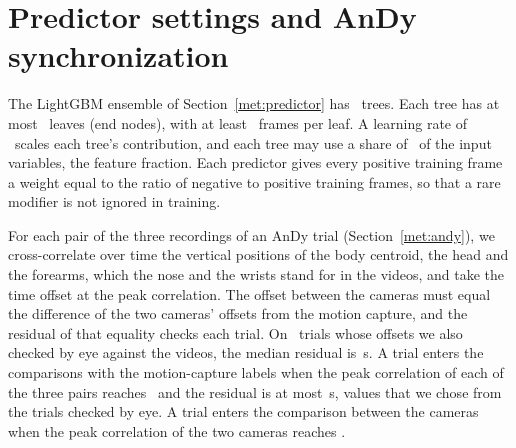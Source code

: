 \documentclass[review,3p,authoryear]{elsarticle}
\begin{document}
\clearpage
\section{Predictor settings and AnDy synchronization}
\label{app:settings}

The LightGBM ensemble of Section~\ref{met:predictor} has \lgbmTrees\ trees. Each tree has
at most \lgbmLeaves\ leaves (end nodes), with at least \lgbmMinLeaf\ frames per leaf. A
learning rate of \lgbmRate\ scales each tree's contribution, and each tree may use a share
of \lgbmFeatureFraction\ of the input variables, the feature fraction. Each
predictor gives every positive training frame a weight equal to the ratio of negative to
positive training frames, so that a rare modifier is not ignored in training.

For each pair of the three recordings of an AnDy trial (Section~\ref{met:andy}), we
cross-correlate over time the vertical positions of the body centroid, the head and the
forearms, which the nose and the wrists stand for in the videos, and take the time offset
at the peak correlation. The offset between the cameras must equal the difference of the two cameras'
offsets from the motion capture, and the residual of that equality checks each trial. On
\andySyncValTrials\ trials whose offsets we also checked by eye against the videos, the
median residual is \andySyncResidMed\,s. A trial enters the comparisons with the
motion-capture labels when the peak correlation of each of the three pairs reaches
\andySyncCorrMin\ and the residual is at most \andySyncResidMax\,s, values that we chose
from the trials checked by eye. A trial enters the comparison between the cameras when the
peak correlation of the two cameras reaches \andySyncCorrMin.



\end{document}
